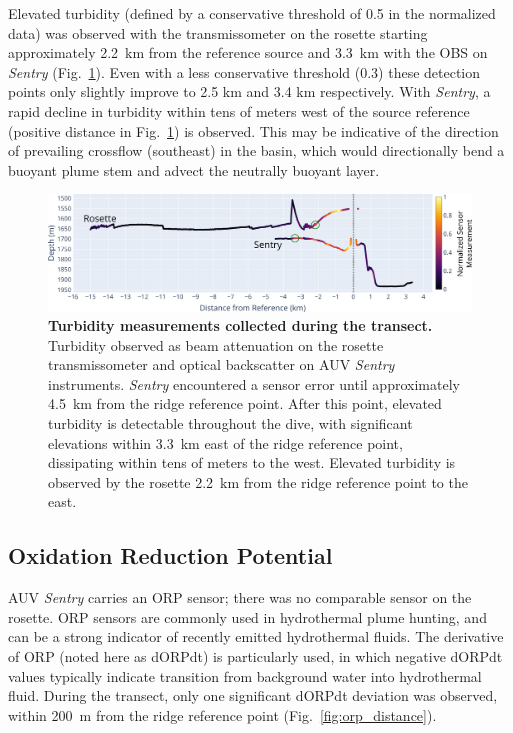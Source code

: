 Elevated turbidity (defined by a conservative threshold of 0.5 in the normalized data) was observed with the transmissometer on the rosette starting approximately \SI{2.2}{\kilo\meter} from the reference source and \SI{3.3}{\kilo\meter} with the OBS on \emph{Sentry} (Fig.~\ref{fig:turbidity_distance}). Even with a less conservative threshold (0.3) these detection points only slightly improve to 2.5 km and 3.4 km respectively. With \emph{Sentry}, a rapid decline in turbidity within tens of meters west of the source reference (positive distance in Fig.~\ref{fig:turbidity_distance}) is observed. This may be indicative of the direction of prevailing crossflow (southeast) in the basin, which would directionally bend a buoyant plume stem and advect the neutrally buoyant layer.

\begin{figure}[h!]
    \centering
    \includegraphics[width=\columnwidth]{figures/chap3_turbidity_over_distance.jpg}
    \caption[Turbidity measurements collected during transect]{\textbf{Turbidity measurements collected during the transect.} Turbidity observed as beam attenuation on the rosette transmissometer and optical backscatter on AUV \emph{Sentry} instruments. \emph{Sentry} encountered a sensor error until approximately \SI{4.5}{\kilo\meter} from the ridge reference point. After this point, elevated turbidity is detectable throughout the dive, with significant elevations within \SI{3.3}{\kilo\meter} east of the ridge reference point, dissipating within tens of meters to the west. Elevated turbidity is observed by the rosette \SI{2.2}{\kilo\meter} from the ridge reference point to the east.}
    \label{fig:turbidity_distance}
\end{figure}


\subsection{Oxidation Reduction Potential}
AUV \emph{Sentry} carries an ORP sensor; there was no comparable sensor on the rosette. ORP sensors are commonly used in hydrothermal plume hunting, and can be a strong indicator of recently emitted hydrothermal fluids. The derivative of ORP (noted here as dORPdt) is particularly used, in which negative dORPdt values typically indicate transition from background water into hydrothermal fluid. During the transect, only one significant dORPdt deviation was observed, within \SI{200}{\meter} from the ridge reference point (Fig.~\ref{fig:orp_distance}). 

